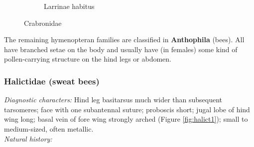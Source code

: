 \documentclass[letterpaper, 11pt]{article}
\begin{document}
\begin{figure}[ht!]
\begin{subfigure}[ht!]{0.4\textwidth}
        \caption{Larrinae habitus \citep[][Fig. 102]{goulet1993hymenoptera}}
        \label{fig:crabronid2}
    \end{subfigure}
    \caption{Crabronidae}\label{fig:crabronids}
\end{figure}
\FloatBarrier

\noindent{}The remaining hymenopteran families are classified in \textbf{Anthophila} (bees). All have branched setae on the body and usually have (in females) some kind of pollen-carrying structure on the hind legs or abdomen.

\subsubsection{Halictidae (sweat bees)}
\noindent{}\textit{Diagnostic characters:} Hind leg basitarsus much wider than subsequent tarsomeres; face with one subantennal suture; proboscis short; jugal lobe of hind wing long; basal vein of fore wing strongly arched (Figure \ref{fig:halict1}); small to medium-sized, often metallic.\\

\noindent{}\textit{Natural history:} \\
\end{document}
